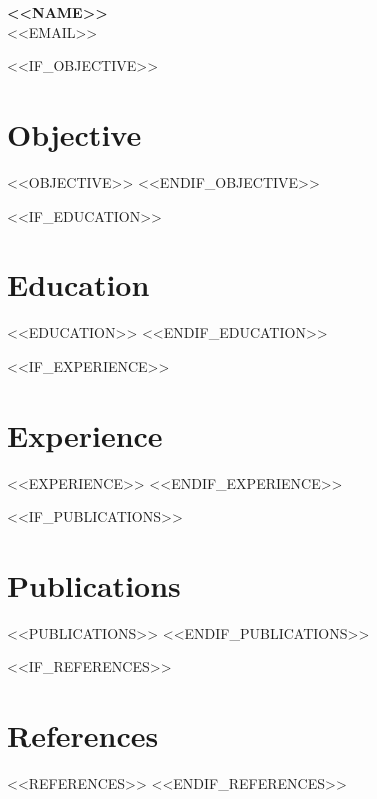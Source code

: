 \documentclass[11pt]{article}
\begin{document}
\begin{center}
{\LARGE\bfseries <<NAME>>}\\[0.5em]
{\normalsize <<EMAIL>>}
\end{center}
\vspace{1em}

<<IF_OBJECTIVE>>
\section*{Objective \hrulefill}
<<OBJECTIVE>>
<<ENDIF_OBJECTIVE>>

<<IF_EDUCATION>>
\section*{Education \hrulefill}
<<EDUCATION>>
<<ENDIF_EDUCATION>>

<<IF_EXPERIENCE>>
\section*{Experience \hrulefill}
<<EXPERIENCE>>
<<ENDIF_EXPERIENCE>>

<<IF_PUBLICATIONS>>
\section*{Publications \hrulefill}
<<PUBLICATIONS>>
<<ENDIF_PUBLICATIONS>>

<<IF_REFERENCES>>
\section*{References \hrulefill}
<<REFERENCES>>
<<ENDIF_REFERENCES>>
\end{document}
